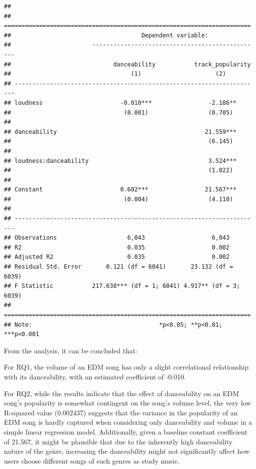 \documentclass[
]{book}
\begin{document}
\begin{verbatim}
## 
## ======================================================================
##                                     Dependent variable:               
##                       ------------------------------------------------
##                             danceability           track_popularity   
##                                  (1)                     (2)          
## ----------------------------------------------------------------------
## loudness                      -0.010***                -2.186**       
##                                (0.001)                 (0.705)        
##                                                                       
## danceability                                          21.559***       
##                                                        (6.145)        
##                                                                       
## loudness:danceability                                  3.524***       
##                                                        (1.022)        
##                                                                       
## Constant                      0.602***                21.567***       
##                                (0.004)                 (4.110)        
##                                                                       
## ----------------------------------------------------------------------
## Observations                    6,043                   6,043         
## R2                              0.035                   0.002         
## Adjusted R2                     0.035                   0.002         
## Residual Std. Error       0.121 (df = 6041)       23.132 (df = 6039)  
## F Statistic           217.638*** (df = 1; 6041) 4.917** (df = 3; 6039)
## ======================================================================
## Note:                                    *p<0.05; **p<0.01; ***p<0.001
\end{verbatim}

From the analysis, it can be concluded that:

For RQ1, the volume of an EDM song has only a slight correlational relationship with its danceability, with an estimated coefficient of -0.010.

For RQ2, while the results indicate that the effect of danceability on an EDM song's popularity is somewhat contingent on the song's volume level, the very low R-squared value (0.002437) suggests that the variance in the popularity of an EDM song is hardly captured when considering only danceability and volume in a simple linear regression model. Additionally, given a baseline constant coefficient of 21.567, it might be plausible that due to the inherently high danceability nature of the genre, increasing the danceability might not significantly affect how users choose different songs of such genres as study music.
\end{document}
